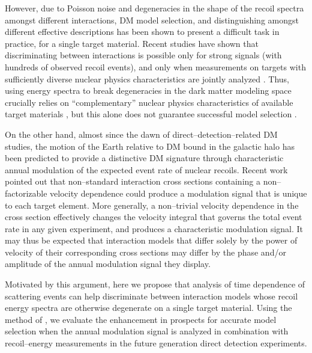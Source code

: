 \documentclass[11pt]{article}
\begin{document}
However, due to Poisson noise and degeneracies in the shape of the recoil spectra amongst different interactions, DM model selection, and distinguishing amongst different effective descriptions has been shown to present a difficult task in practice, for a single target material. Recent studies have shown that discriminating between interactions is possible only for strong signals (with hundreds of observed recoil events), and only when measurements on targets with sufficiently diverse nuclear physics characteristics are jointly analyzed \cite{Gluscevic:2015sqa}. Thus, using energy spectra to break degeneracies in the dark matter modeling space crucially relies on ``complementary'' nuclear physics characteristics of available target materials \cite{McDermott:2011hx,Peter:2013aha,Gluscevic:2014vga,Catena:2014epa,Catena:2014hla,Dent:2015zpa,Gluscevic:2015sqa,Ruppin:2014bra}, but this alone does not guarantee successful model selection \cite{Gluscevic:2014vga}.

On the other hand, almost since the dawn of direct--detection--related DM studies, the motion of the Earth relative to DM bound in the galactic halo has been predicted to provide a distinctive DM signature \cite{Freese:1987wu, Freese:2012xd,Lee:2013xxa,Britto:2014wga,DelNobile:2015nua,Kouvaris:2015xga} through characteristic annual modulation of the expected event rate of nuclear recoils. Recent work \cite{DelNobile:2015tza,DelNobile:2015rmp} pointed out that non--standard interaction cross sections containing a non--factorizable velocity dependence could produce a modulation signal that is unique to each target element. More generally, a non--trivial velocity dependence in the cross section effectively changes the velocity integral that governs the total event rate in any given experiment, and produces a characteristic modulation signal. It may thus be expected that interaction models that differ solely by the power of velocity of their corresponding cross sections may differ by the phase and/or amplitude of the annual modulation signal they display. 

Motivated by this argument, here we propose that analysis of time dependence of scattering events can help discriminate between interaction models whose recoil energy spectra are otherwise degenerate on a single target material. Using the method of \cite{Gluscevic:2015sqa}, we evaluate the enhancement in prospects for accurate model selection when the annual modulation signal is analyzed in combination with recoil--energy measurements in the future generation direct detection experiments. 
\end{document}
